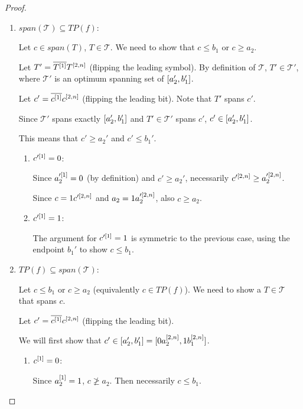\begin{proof}
\begin{enumerate}
\item $span(\mathcal{T}) \subseteq TP(f)$:

Let $c \in span(T)$, $T \in \mathcal{T}$.
We need to show that $c \leq b_1$ or $c \geq a_2$.

Let $T' = \overline{T^{[1]}} T^{[2, n]}$
(flipping the leading symbol).
By definition of $\mathcal{T}$,
$T' \in \mathcal{T}'$,
where $\mathcal{T}'$ is an optimum spanning set
of $[a_2', b_1']$.

Let $c' = \overline{c^{[1]}} c^{[2, n]}$
(flipping the leading bit).
Note that $T'$ spans $c'$.

Since $\mathcal{T}'$ spans exactly $[a_2', b_1']$
and $T' \in \mathcal{T}'$ spans $c'$,
$c' \in [a_2', b_1']$.

This means that $c' \geq a_2'$ and $c' \leq b_1'$.

\begin{enumerate}
\item $c'^{[1]} = 0$:

Since $a_2'^{[1]} = 0$ (by definition)
and $c' \geq a_2'$,
necessarily $c'^{[2, n]} \geq a_2'^{[2, n]}$.

Since $c = 1 c'^{[2, n]}$
and $a_2 = 1 a_2'^{[2, n]}$,
also $c \geq a_2$.

\item $c'^{[1]} = 1$:

The argument for $c'^{[1]} = 1$ is symmetric
to the previous case,
using the endpoint $b_1'$
to show $c \leq b_1$.
\end{enumerate}

\item $TP(f) \subseteq span(\mathcal{T})$:

Let $c \leq b_1$ or $c \geq a_2$
(equivalently $c \in TP(f)$).
We need to show a $T \in \mathcal{T}$ that spans $c$.

Let $c' = \overline{c^{[1]}} c^{[2, n]}$
(flipping the leading bit).

We will first show that $c' \in [a_2', b_1']
= [0 a_2^{[2, n]}, 1 b_1^{[2, n]}]$.

\begin{enumerate}
\item $c^{[1]} = 0$:

Since $a_2^{[1]} = 1$,
$c \ngeq a_2$.
Then necessarily $c \leq b_1$.


\end{enumerate}
\end{enumerate}
\end{proof}
